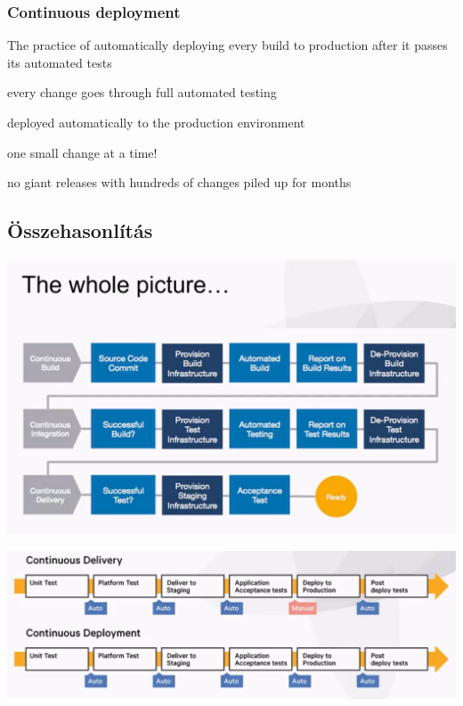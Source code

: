 \documentclass[a4paper,14pt, twocolumn]{extarticle}
\begin{document}
		\subsubsection{Continuous deployment}
			The practice of automatically deploying every build to production after it passes its automated tests
				\begin{compactitem}
					\item every change goes through full automated testing 
					\item deployed automatically to the production environment 
					\item one small change at a time! 
					\item no giant releases with hundreds of changes piled up for months
				\end{compactitem}
		\onecolumn
		\subsection{Összehasonlítás}
		\begin{center}
			\includegraphics[width=16cm]{ciWhole}
		\end{center}
		\begin{center}
			\includegraphics[width=16cm]{cdcd}
		\end{center}
		\newpage
\end{document}

